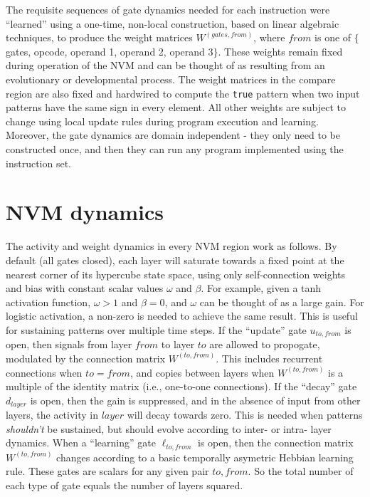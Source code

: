 \documentclass[pdftex,12pt,letterpaper]{article}
\begin{document}
The requisite sequences of gate dynamics needed for each instruction were ``learned'' using a one-time, non-local construction, based on linear algebraic techniques, to produce the weight matrices $W^{(gates, from)}$, where $from$ is one of $\{$gates, opcode, operand 1, operand 2, operand 3$\}$.  These weights remain fixed during operation of the NVM and can be thought of as resulting from an evolutionary or developmental process.  The weight matrices in the compare region are also fixed and hardwired to compute the \texttt{true} pattern when two input patterns have the same sign in every element.  All other weights are subject to change using local update rules during program execution and learning.  Moreover, the gate dynamics are domain independent - they only need to be constructed once, and then they can run any program implemented using the instruction set.

\section{NVM dynamics}

The activity and weight dynamics in every NVM region work as follows.  By default (all gates closed), each layer will saturate towards a fixed point at the nearest corner of its hypercube state space, using only self-connection weights and bias with constant scalar values $\omega$ and $\beta$.  For example, given a tanh activation function, $\omega > 1$ and $\beta = 0$, and $\omega$ can be thought of as a large gain.  For logistic activation, a non-zero is needed to achieve the same result.  This is useful for sustaining patterns over multiple time steps.  If the ``update'' gate $u_{to,from}$ is open, then signals from layer $from$ to layer $to$ are allowed to propogate, modulated by the connection matrix $W^{(to,from)}$.  This includes recurrent connections when $to = from$, and copies between layers when $W^{(to,from)}$ is a multiple of the identity matrix (i.e., one-to-one connections).  If the ``decay'' gate $d_{layer}$ is open, then the gain is suppressed, and in the absence of input from other layers, the activity in $layer$ will decay towards zero.  This is needed when patterns \emph{shouldn't} be sustained, but should evolve according to inter- or intra- layer dynamics.  When a ``learning'' gate $\ell_{to,from}$ is open, then the connection matrix $W^{(to,from)}$ changes according to a basic temporally asymetric Hebbian learning rule.  These gates are scalars for any given pair $to,from$.  So the total number of each type of gate equals the number of layers squared.
\end{document}

